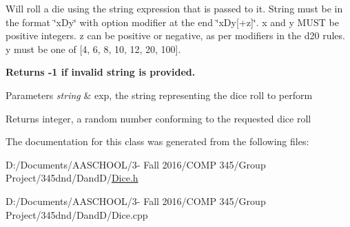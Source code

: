 Will \textquotesingle{}roll\textquotesingle{} a die using the string expression that is passed to it. String must be in the format \char`\"{}x\+Dy\char`\"{} with option modifier at the end \char`\"{}x\+Dy\mbox{[}+z\mbox{]}\char`\"{}. x and y M\+U\+ST be positive integers. z can be positive or negative, as per modifiers in the d20 rules. y must be one of \mbox{[}4, 6, 8, 10, 12, 20, 100\mbox{]}.

{\bfseries Returns -\/1 if invalid string is provided.}

{\bfseries 
\begin{DoxyParams}{Parameters}
{\em string} & exp, the string representing the dice roll to perform \\
\hline
\end{DoxyParams}
\begin{DoxyReturn}{Returns}
integer, a random number conforming to the requested dice roll 
\end{DoxyReturn}
}

The documentation for this class was generated from the following files\+:\begin{DoxyCompactItemize}
\item 
D\+:/\+Documents/\+A\+A\+S\+C\+H\+O\+O\+L/3-\/ Fall 2016/\+C\+O\+M\+P 345/\+Group Project/345dnd/\+Dand\+D/\hyperlink{_dice_8h}{Dice.\+h}\item 
D\+:/\+Documents/\+A\+A\+S\+C\+H\+O\+O\+L/3-\/ Fall 2016/\+C\+O\+M\+P 345/\+Group Project/345dnd/\+Dand\+D/Dice.\+cpp\end{DoxyCompactItemize}
